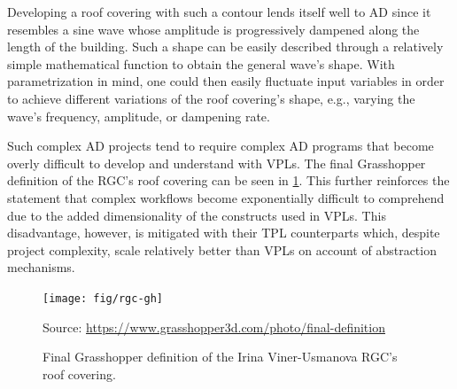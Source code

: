 Developing a roof covering with such a contour lends itself well to \ac{AD}
since it resembles a sine wave whose amplitude is progressively dampened along
the length of the building.  Such a shape can be easily described through a
relatively simple mathematical function to obtain the general wave's shape.
With parametrization in mind, one could then easily fluctuate input variables in
order to achieve different variations of the roof covering's shape, e.g.,
varying the wave's frequency, amplitude, or dampening rate.

Such complex \ac{AD} projects tend to require complex \ac{AD} programs that
become overly difficult to develop and understand with \acp{VPL}.  The final
Grasshopper definition of the \ac{RGC}'s roof covering can be seen in
\cref{fig:related.ad.vpl-scalability.rgc-gh}.  This further reinforces the
statement that complex workflows become exponentially difficult to comprehend
due to the added dimensionality of the constructs used in \acp{VPL}.  This
disadvantage, however, is mitigated with their \ac{TPL} counterparts which,
despite project complexity, scale relatively better than \acp{VPL} on account of
abstraction mechanisms.

\begin{landscape}
\begin{figure}
  \texttt{[image: fig/rgc-gh]}
  \begin{minipage}{\linewidth}
  \scriptsize Source: \url{https://www.grasshopper3d.com/photo/final-definition}
  \end{minipage}
  \caption[Grasshopper definition of the \acl{RGC}'s roof covering]{
    Final Grasshopper definition of the Irina Viner-Usmanova \ac{RGC}'s roof
    covering.}%
  \label{fig:related.ad.vpl-scalability.rgc-gh}
\end{figure}
\end{landscape}
